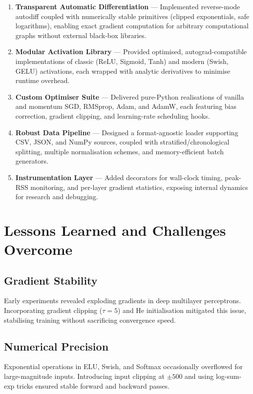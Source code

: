 \documentclass[11pt,a4paper]{report}
\begin{document}
\begin{enumerate}
    \item \textbf{Transparent Automatic Differentiation} — Implemented reverse-mode autodiff coupled with numerically stable primitives (clipped exponentials, safe logarithms), enabling exact gradient computation for arbitrary computational graphs without external black-box libraries.
    \item \textbf{Modular Activation Library} — Provided optimised, autograd-compatible implementations of classic (ReLU, Sigmoid, Tanh) and modern (Swish, GELU) activations, each wrapped with analytic derivatives to minimise runtime overhead.
    \item \textbf{Custom Optimiser Suite} — Delivered pure-Python realisations of vanilla and momentum SGD, RMSprop, Adam, and AdamW, each featuring bias correction, gradient clipping, and learning-rate scheduling hooks.
    \item \textbf{Robust Data Pipeline} — Designed a format-agnostic loader supporting CSV, JSON, and NumPy sources, coupled with stratified/chronological splitting, multiple normalisation schemes, and memory-efficient batch generators.
    \item \textbf{Instrumentation Layer} — Added decorators for wall-clock timing, peak-RSS monitoring, and per-layer gradient statistics, exposing internal dynamics for research and debugging.
\end{enumerate}

\section{Lessons Learned and Challenges Overcome}

\subsection*{Gradient Stability}

Early experiments revealed exploding gradients in deep multilayer perceptrons. Incorporating gradient clipping (\(\tau = 5\)) and He initialisation mitigated this issue, stabilising training without sacrificing convergence speed.

\subsection*{Numerical Precision}

Exponential operations in ELU, Swish, and Softmax occasionally overflowed for large-magnitude inputs. Introducing input clipping at \(\pm500\) and using log-sum-exp tricks ensured stable forward and backward passes.
\end{document}
